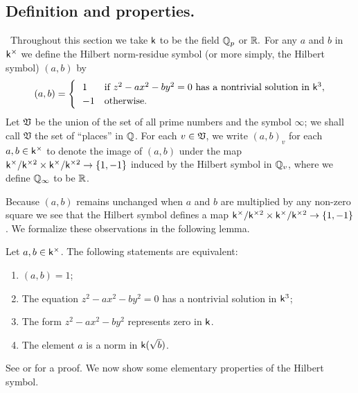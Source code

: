 \subsection{Definition and properties.}~Throughout this section we take \(\mathsf{k}\) to be the field \(\mathbb{Q}_p\) or \(\mathbb{R}.\) For any \(a\) and \(b\) in \(\mathsf{k}^{\times}\) we define the Hilbert norm-residue symbol (or more simply, the Hilbert symbol) \((a, b)\) by
\[
    (a, b) = \begin{cases}
        \ \ 1 & \text{if } z^2 - ax^2 - by^2 = 0 \text{ has a nontrivial solution in } \mathsf{k}^3, \\
        \ \ -1 & \text{otherwise}.
    \end{cases}
\]
\label{sec:hilbert-symbol-intro}
Let \(\mathfrak{V}\) be the union of the set of all prime numbers and the symbol \(\infty\); we shall call \(\mathfrak{V}\) the set of ``places'' in \(\mathbb{Q}\). For each \(v \in \mathfrak{V}\), we write \((a, b)_v\) for  each \(a, b \in \mathsf{k}^{\times}\) to denote the image of \((a, b)\) under the map \(\mathsf{k}^{\times}/\mathsf{k}^{\times2} \times \mathsf{k}^{\times}/\mathsf{k}^{\times2} \to \{1, -1\}\) induced by the Hilbert symbol in \(\mathbb{Q}_v\), where we define \(\mathbb{Q}_{\infty}\) to be \(\mathbb{R}\).

Because \((a, b)\) remains unchanged when \(a\) and \(b\) are multiplied by any non-zero square we see that the Hilbert symbol defines a map \(\mathsf{k}^{\times}/\mathsf{k}^{\times2} \times \mathsf{k}^{\times}/\mathsf{k}^{\times2} \to \{1, -1\}\). We formalize these observations in the following lemma.
\begin{lemma}
    Let \(a, b \in \mathsf{k}^{\times}\). The following statements are equivalent:

    \medskip

    \begin{enumerate}[nosep, label=(\alph*)]
        \item \((a, b) = 1\);
        \item The equation \(z^2 - ax^2 - by^2 = 0\) has a nontrivial solution in \(\mathsf{k}^3\);
        \item The form \(z^2 - ax^2 - by^2\) represents zero in \(\mathsf{k}\).
        \item The element \(a\) is a norm in \(\mathsf{k}(\sqrt{b})\).
    \end{enumerate}
\end{lemma}

See \cite[pp.~17--18]{serre2012course} or \cite[p.~1]{sutherland2013introduction10} for a proof. We now show some elementary properties of the Hilbert symbol.

